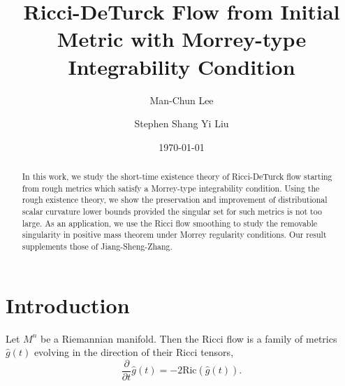 \documentclass[12pt]{amsart}
\theoremstyle{plain}
\theoremstyle{plain}
\theoremstyle{definition}
\theoremstyle{remark}
\numberwithin{equation}{subsection}
\begin{document}
\title[]
{Ricci-DeTurck Flow from Initial Metric with Morrey-type Integrability Condition}

\author{Man-Chun Lee}
\address[Man-Chun Lee]{Room 237, Lady Shaw Building,
The Chinese University of Hong Kong,
Shatin, N.T., Hong Kong}

\author{Stephen Shang Yi Liu}
\address[Stephen Shang Yi Liu]{Room 222A, Lady Shaw Building,
The Chinese University of Hong Kong,
Shatin, N.T., Hong Kong}

\renewcommand{\subjclassname}{
  \textup{2010} Mathematics Subject Classification}

\date{\today}

\begin{abstract}
  In this work, we study the short-time existence theory of Ricci-DeTurck flow starting from rough metrics which satisfy a Morrey-type integrability condition. Using the rough existence theory, we show the preservation and improvement of distributional scalar curvature lower bounds  provided the singular set for such metrics is not too large. As an application, we use the Ricci flow smoothing to study the removable singularity in positive mass theorem under Morrey regularity conditions. Our result supplements those of Jiang-Sheng-Zhang.
\end{abstract}


\maketitle

%
%
%

\section{Introduction}\label{sec:introduction}





Let $M^n$ be a Riemannian manifold. Then the Ricci flow is a family of metrics $\hat g(t)$ evolving in the direction of their Ricci tensors,
\begin{equation*}
    \frac{\partial}{\partial t} \hat g(t) = -2\text{Ric}(\hat g(t)).
\end{equation*}
\end{document}
